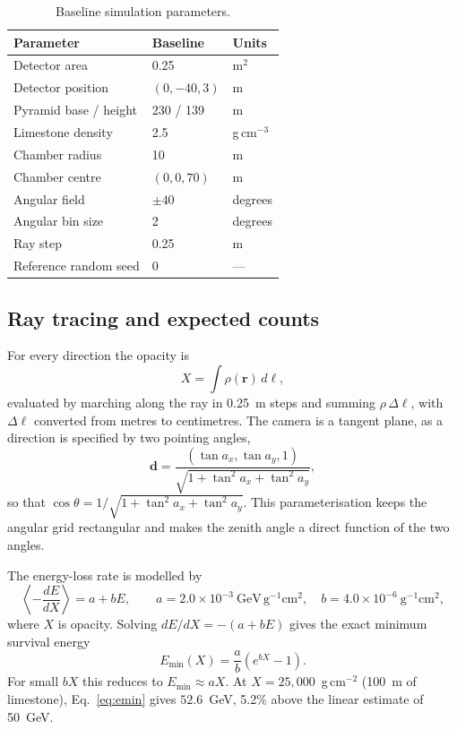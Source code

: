 \documentclass{article}
\begin{document}
\begin{table}[t]
\centering
\caption{Baseline simulation parameters.}
\label{tab:params}
\small
\begin{tabular}{@{}lll@{}}
\toprule
Parameter & Baseline & Units \\
\midrule
Detector area & 0.25 & m$^2$ \\
Detector position & $(0,-40,3)$ & m \\
Pyramid base / height & 230 / 139 & m \\
Limestone density & 2.5 & g\,cm$^{-3}$ \\
Chamber radius & 10 & m \\
Chamber centre & $(0,0,70)$ & m \\
Angular field & $\pm40$ & degrees \\
Angular bin size & 2 & degrees \\
Ray step & 0.25 & m \\
Reference random seed & 0 & --- \\
\bottomrule
\end{tabular}
\end{table}


\subsection{Ray tracing and expected counts}

For every direction the opacity is
\begin{equation}
X=\int \rho(\mathbf{r})\,d\ell,
\label{eq:opacity}
\end{equation}
evaluated by marching along the ray in 0.25~m steps and summing
$\rho\,\Delta\ell$, with $\Delta\ell$ converted from metres to centimetres. The
camera is a tangent plane, as a direction is specified by two pointing angles,
\begin{equation}
\mathbf{d}=\frac{(\tan a_x,\tan a_y,1)}
{\sqrt{1+\tan^2a_x+\tan^2a_y}},
\label{eq:direction}
\end{equation}
so that $\cos\theta=1/\sqrt{1+\tan^2a_x+\tan^2a_y}$. This parameterisation
keeps the angular grid rectangular and makes the zenith angle a direct
function of the two angles.

The energy-loss rate is modelled by
\begin{equation}
\left\langle-\frac{dE}{dX}\right\rangle=a+bE,
\qquad
a=2.0\times10^{-3}~\mathrm{GeV\,g^{-1}cm^2},\quad
b=4.0\times10^{-6}~\mathrm{g^{-1}cm^2},
\label{eq:loss}
\end{equation}
where $X$ is opacity. Solving $dE/dX=-(a+bE)$ gives the exact minimum
survival energy
\begin{equation}
E_{\min}(X)=\frac{a}{b}\left(e^{bX}-1\right).
\label{eq:emin}
\end{equation}
For small $bX$ this reduces to $E_{\min}\approx aX$. At
$X=25{,}000$~g\,cm$^{-2}$ (100~m of limestone), Eq.~\eqref{eq:emin}
gives $52.6$~GeV, 5.2\% above the linear estimate of 50~GeV.
\end{document}
